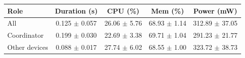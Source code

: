 \begin{tabular}{lcccc}
\hline
\textbf{Role} & \textbf{Duration (s)} & \textbf{CPU (\%)} & \textbf{Mem (\%)} & \textbf{Power (mW)} \\
\hline
All & 0.125 $\pm$ 0.057 & 26.06 $\pm$ 5.76 & 68.93 $\pm$ 1.14 & 312.89 $\pm$ 37.05 \\
Coordinator & 0.199 $\pm$ 0.030 & 22.69 $\pm$ 3.38 & 69.71 $\pm$ 1.04 & 291.23 $\pm$ 21.77 \\
Other devices & 0.088 $\pm$ 0.017 & 27.74 $\pm$ 6.02 & 68.55 $\pm$ 1.00 & 323.72 $\pm$ 38.73 \\
\hline
\end{tabular}
